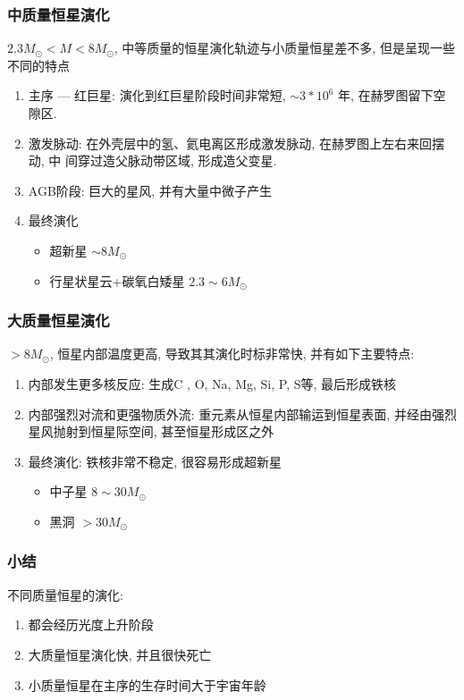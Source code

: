 \subsubsection{中质量恒星演化}
$2.3M_{\odot}<M<8M_{\odot}$, 中等质量的恒星演化轨迹与小质量恒星差不多, 但是呈现一些不同的特点
\begin{enumerate}\small
    \item 主序 --- 红巨星: 演化到红巨星阶段时间非常短, $\sim 3*10^6$ 年, 在赫罗图留下空隙区. 
    \item 激发脉动: 在外壳层中的氢、氦电离区形成激发脉动, 在赫罗图上左右来回摆动, 中
    间穿过造父脉动带区域, 形成造父变星. 
    \item AGB阶段: 巨大的星风, 并有大量中微子产生
    \item 最终演化
    \begin{itemize}
        \item 超新星 $\sim 8M_{\odot}$
        \item 行星状星云+碳氧白矮星 $2.3\sim 6M_{\odot}$
    \end{itemize}
\end{enumerate}

\subsubsection{大质量恒星演化}
$>8M_{\odot}$, 恒星内部温度更高, 导致其其演化时标非常快, 并有如下主要特点:
\begin{enumerate}\small
    \item 内部发生更多核反应: 生成C , O, Na, Mg, Si, P, S等, 最后形成铁核
    \item 内部强烈对流和更强物质外流:  重元素从恒星内部输运到恒星表面, 并经由强烈星风抛射到恒星际空间, 甚至恒星形成区之外
    \item 最终演化:  铁核非常不稳定, 很容易形成超新星
    \begin{itemize}
        \item 中子星 $8\sim 30M_{\odot}$
        \item 黑洞 $>30 M_{\odot}$
    \end{itemize}
\end{enumerate}


\subsubsection{小结}
不同质量恒星的演化:
\begin{enumerate}\small
    \item 都会经历光度上升阶段
    \item 大质量恒星演化快, 并且很快死亡
    \item 小质量恒星在主序的生存时间大于宇宙年龄
\end{enumerate}

